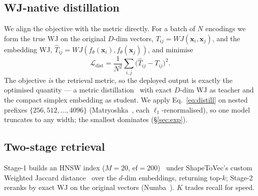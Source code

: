 \documentclass[sigconf]{acmart}
\begin{document}
\subsection{WJ-native distillation}
\label{sec:distill}
We align the objective with the metric directly. For a batch of $N$ encodings we
form the true WJ on the original $D$-dim vectors, $T_{ij}=WJ(\mathbf{x}_i,\mathbf{x}_j)$,
and the embedding WJ, $\hat T_{ij}=WJ(f_\theta(\mathbf{x}_i),f_\theta(\mathbf{x}_j))$, and minimise
\begin{equation}
  \mathcal{L}_{\mathrm{dist}}=\frac{1}{N^2}\sum_{i,j}\big(\hat T_{ij}-T_{ij}\big)^2 .
  \label{eq:distill}
\end{equation}
The objective \emph{is} the retrieval metric, so the deployed output is exactly the
optimised quantity --- a metric distillation~\cite{hinton15} with exact $D$-dim WJ
as teacher and the compact simplex embedding as student. We apply
Eq.~\eqref{eq:distill} on nested prefixes $\{256, 512, \dots,4096\}$
(Matryoshka~\cite{matryoshka22}, each $\ell_1$-renormalised), so one model truncates
to any width; the smallest %
dominates (\S\ref{sec:exp}).

\subsection{Two-stage retrieval}
Stage-1 builds an HNSW index ($M{=}20$, $\mathrm{ef}{=}200$)~\cite{hnsw20} under
ShapeToVec's custom Weighted Jaccard distance~\cite{shape2vec} over the $d$-dim
embeddings, returning top-$k$; Stage-2 reranks by exact WJ on the original vectors
(Numba~\cite{lam15}). $K$ trades recall for speed.

\end{document}
